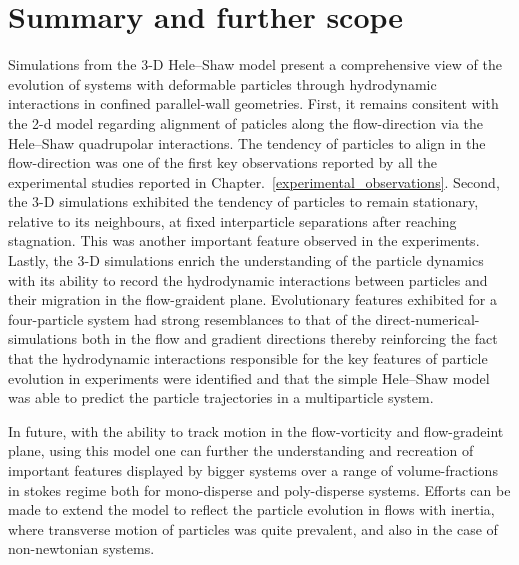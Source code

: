 \chapter{Summary and further scope}\label{Summary}

Simulations from the 3-D Hele--Shaw model present a comprehensive view of the evolution of systems with deformable particles through hydrodynamic interactions in confined parallel-wall geometries. First, it remains consitent with the 2-d model regarding alignment of paticles along the flow-direction via the Hele--Shaw quadrupolar interactions\cite{Reference33}. The tendency of particles to align in the flow-direction was one of the first key observations reported by all the experimental studies\cite{Reference15}\cite{Reference16}\cite{Reference30} reported in Chapter.~\ref{experimental_observations}. Second, the 3-D simulations exhibited the tendency of particles to remain stationary, relative to its neighbours, at fixed interparticle separations after reaching stagnation. This was another important feature observed in the experiments. Lastly, the 3-D simulations enrich the understanding of the particle dynamics with its ability to record the hydrodynamic interactions between particles and their migration in the flow-graident plane. Evolutionary features exhibited for a four-particle system had strong resemblances to that of the direct-numerical-simulations both in the flow and gradient directions thereby reinforcing the fact that the hydrodynamic interactions responsible for the key features of particle evolution in experiments were identified and that the simple Hele--Shaw model was able to predict the particle trajectories in a multiparticle system.

In future, with the ability to track motion in the flow-vorticity and flow-gradeint plane, using this model one can further the understanding and recreation of important features displayed by bigger systems over a range of volume-fractions in stokes regime both for mono-disperse and poly-disperse systems. Efforts can be made to extend the model to reflect the particle evolution in flows with inertia, where transverse motion of particles was quite prevalent, and also in the case of non-newtonian systems.